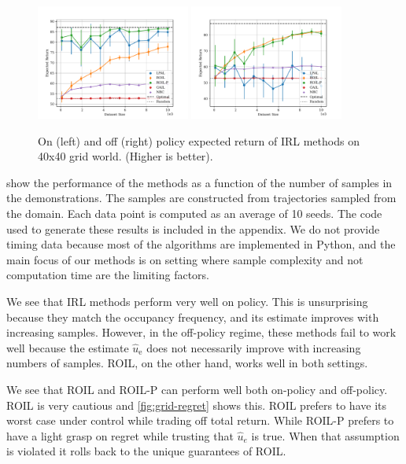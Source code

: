 \documentclass[10pt]{article}
\theoremstyle{plain}
\theoremstyle{remark}
\begin{document}
\begin{figure}
	\centering
	\includegraphics[width=0.45\textwidth]{../src/plots/returns/40x40_gridworld_on_policy_returns.pdf}
	\includegraphics[width=0.45\textwidth]{../src/plots/returns/40x40_gridworld_off_policy_returns.pdf}
	\caption{On (left) and off (right) policy expected return of IRL methods on 40x40 grid world. (Higher is better).}
	\label{fig:grid-40}
\end{figure}

 show the performance of the methods as a function of the number of samples in the demonstrations. The samples are constructed from trajectories sampled from the domain. Each data point is computed as an average of 10 seeds. The code used to generate these results is included in the appendix. We do not provide timing data because most of the algorithms are implemented in Python, and the main focus of our methods is on setting where sample complexity and not computation time are the limiting factors. 

We see that IRL methods perform very well on policy. This is unsurprising because they match the occupancy frequency, and its estimate improves with increasing samples. However, in the off-policy regime, these methods fail to work well because the estimate $\hat{u}_{\mathrm{e}}$ does not necessarily improve with increasing numbers of samples. ROIL, on the other hand, works well in both settings. 

We see that ROIL and ROIL-P can perform well both on-policy and off-policy. ROIL is very cautious and \cref{fig:grid-regret} shows this. ROIL prefers to have its worst case under control while trading off total return. While ROIL-P prefers to have a light grasp on regret while trusting that $\hat{u}_e$ is true. When that assumption is violated it rolls back to the unique guarantees of ROIL.
\end{document}
